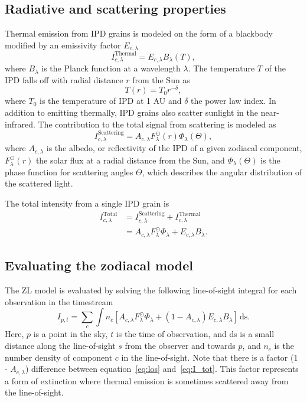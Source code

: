 \documentclass[twocolumn]{aa}
\begin{document}
\subsection{Radiative and scattering properties}
Thermal emission from IPD grains is modeled on the form of a blackbody
 modified by an emissivity factor $E_{c, \lambda}$
\begin{equation}
    I^\mathrm{Thermal}_{c,\lambda} = E_{c,\lambda} B_\lambda(T),
\end{equation}
where $B_\lambda$ is the Planck function at a wavelength $\lambda$. The 
temperature $T$ of the IPD falls off with radial distance $r$ from the 
Sun as
\begin{equation}
    T(r) = T_0 r^{-\delta},
\end{equation}
where $T_0$ is the temperature of IPD at 1 AU and $\delta$ the power law 
index. In addition to emitting thermally, IPD grains also scatter 
sunlight in the near-infrared. The contribution to the total signal from 
scattering is modeled as
\begin{equation}\label{eq: scat_term}
    I^\mathrm{Scattering}_{c, \lambda} = A_{c, \lambda} F_\lambda^\odot(r) \Phi_\lambda(\Theta),
\end{equation}
where $A_{c, \lambda}$ is the albedo, or reflectivity of the IPD of a 
given zodiacal component, $F_\lambda^\odot(r)$ the solar flux at a 
radial distance from the Sun, and $\Phi_\lambda(\Theta)$ is the phase 
function for scattering angles $\Theta$, which describes the angular 
distribution of the scattered light.

The total intensity from a single IPD grain is
\begin{align}\label{eq:I_tot}
    I^\mathrm{Total}_{c, \lambda} &= I^\mathrm{Scattering}_{c,\lambda} + I^\mathrm{Thermal}_{c,\lambda}\\
    &= A_{c, \lambda} F_\lambda^\odot \Phi_\lambda + E_{c,\lambda} B_\lambda.
\end{align}

\subsection{Evaluating the zodiacal model}
The ZL model is evaluated by solving the following line-of-sight 
integral for each observation in the timestream
\begin{equation}\label{eq:los}
    I_{p,t} = \sum_c \int n_c \left[  A_{c, \lambda} F_\lambda^\odot \Phi_\lambda + \left( 1 - A_{c, \lambda} \right) E_{c,\lambda} B_\lambda \right]\,\mathrm {ds}.
\end{equation}
Here, $p$ is a point in the sky, $t$ is the time of observation, and ds 
is a small distance along the line-of-sight $s$ from the observer and 
towards $p$, and $n_c$ is the number density of component $c$ in the 
line-of-sight. Note that there is a factor (1 - $A_{c, \lambda}$) 
difference between equation~\eqref{eq:los} and~\eqref{eq:I_tot}. This 
factor represents a form of extinction where thermal emission is 
sometimes scattered away from the line-of-sight. 
\end{document}

